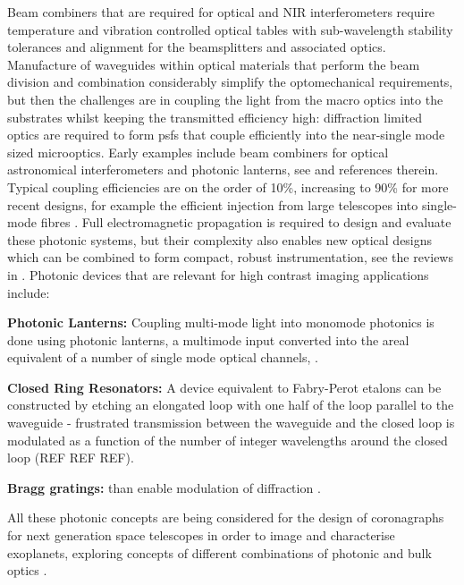 \documentclass[letterpaper]{ar-1col}
\begin{document}
Beam combiners that are required for optical and NIR interferometers require temperature and vibration controlled optical tables with sub-wavelength stability tolerances and alignment for the beamsplitters and associated optics.
%
Manufacture of waveguides within optical materials that perform the beam division and combination considerably simplify the optomechanical requirements, but then the challenges are in coupling the light from the macro optics into the substrates whilst keeping the transmitted efficiency high: diffraction limited optics are required to form \acp{psf} that couple efficiently into the near-single mode sized microoptics.
%
Early examples include beam combiners for optical astronomical interferometers \citep[for example the IOTA/IONIC beam combiner; ][]{Berger01} and photonic lanterns, see \citet{Leon-Saval10} and references therein.
%
Typical coupling efficiencies are on the order of 10\%, increasing to 90\% for more recent designs, for example the efficient injection from large telescopes into single-mode fibres \citep{Jovanovic17}.
%
Full electromagnetic propagation is required to design and evaluate these photonic systems, but their complexity also enables new optical designs which can be combined to form compact, robust instrumentation, see the reviews in \citet{Minardi21,Jovanovic23}.
%
Photonic devices that are relevant for high contrast imaging applications include:

{\bf Photonic Lanterns: } Coupling multi-mode light into monomode photonics is done using photonic lanterns, a multimode input converted into the areal equivalent of a number of single mode optical channels, \citep{Norris22}.

{\bf Closed Ring Resonators: } A device equivalent to Fabry-Perot etalons can be constructed by etching an elongated loop with one half of the loop parallel to the waveguide - frustrated transmission between the waveguide and the closed loop is modulated as a function of the number of integer wavelengths around the closed loop (REF REF REF).

{\bf Bragg gratings: } than enable modulation of diffraction \citep{FaggingerAuer24}.

All these photonic concepts are being considered for the design of coronagraphs for next generation space telescopes in order to image and characterise exoplanets, exploring concepts of different combinations of photonic and bulk optics \citep{Desai23a}.

%
\end{document}
